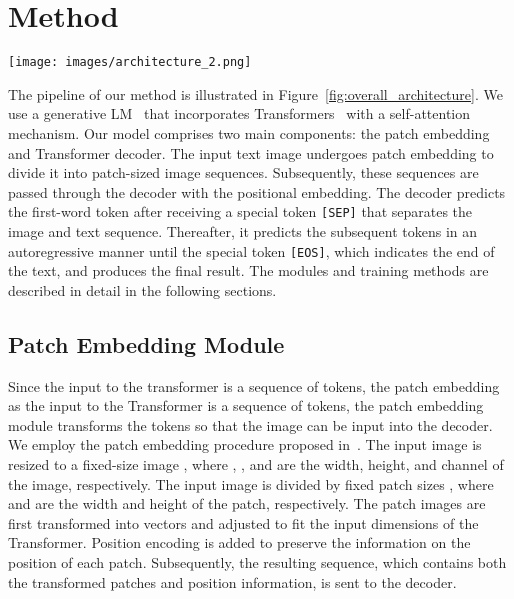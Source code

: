 \documentclass[10pt,twocolumn,letterpaper]{article}
\begin{document}
\section{Method} \label{method}
\begin{figure*}[htp]
	\centering
	\texttt{[image: images/architecture\_2.png]}
	\caption{
Architecture of proposed DTrOCR, which
consists of patch embedding and decoder modules.
The input images are transformed into one-dimensional sequences using the patch embedding and then sent to the decoder along with the positional encoding. 
The decoder uses the special token \texttt{[SEP]} to indicate sequence separation.
Thereafter, it predicts the subsequent word token based on the sequence condition.
It continues to generate text autoregressively until it reaches the end of the text token \texttt{[EOS]}.
	}
	\label{fig:overall_architecture}
\end{figure*}

The pipeline of our method is illustrated in Figure~\ref{fig:overall_architecture}.
We use a generative LM~\cite{radford2019language} that incorporates Transformers~\cite{vaswani2017transformer} with a self-attention mechanism. 
Our model comprises two main components: the patch embedding and Transformer decoder. 
The input text image undergoes patch embedding to divide it into patch-sized image sequences. 
Subsequently, these sequences are passed through the decoder with the positional embedding. 
The decoder predicts the first-word token after receiving a special token \texttt{[SEP]} that separates the image and text sequence. 
Thereafter, it predicts the subsequent tokens in an autoregressive manner until the special token \texttt{[EOS]}, which indicates the end of the text, and produces the final result. 
The modules and training methods are described in detail in the following sections.

\subsection{Patch Embedding Module}
Since the input to the transformer is a sequence of tokens, the patch embedding as the input to the Transformer is a sequence of tokens, the patch embedding module transforms the tokens so that the image can be input into the decoder.
We employ the patch embedding procedure proposed in~\cite{dosovitskiy2020vit}.
The input image is resized to a fixed-size image , where , , and  are the width, height, and channel of the image, respectively.
The input image is divided by fixed patch sizes , where  and  are the width and height of the patch, respectively.
The patch images are first transformed into vectors and adjusted to fit the input dimensions of the Transformer.
Position encoding is added to preserve the information on the position of each patch. 
Subsequently, the resulting sequence, which contains both the transformed patches and position information, is sent to the decoder.
\end{document}
